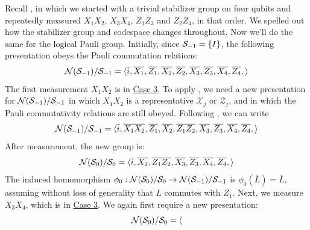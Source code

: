 \begin{example}\label{ex:bacon_shor_logical_pauli_group_updates}
    Recall , in which we started with a trivial stabilizer group on four qubits and repeatedly measured $X_1 X_2$, $X_3 X_4$, $Z_1 Z_3$ and $Z_2 Z_4$, in that order.
    We spelled out how the stabilizer group and codespace changes throughout.
    Now we'll do the same for the logical Pauli group.
    Initially, since $\mathcal{S}_{-1} = \{I\}$, the following presentation obeys the Pauli commutation relations:
    \begin{equation}
        \mathcal{N}(\mathcal{S}_{-1})/\mathcal{S}_{-1} = \langle
            \overline{i},
            \overline{X_1}, \overline{Z_1},
            \overline{X_2}, \overline{Z_2},
            \overline{X_3}, \overline{Z_3},
            \overline{X_4}, \overline{Z_4},
        \rangle
    \end{equation}
    The first measurement $X_1 X_2$ is in \hyperref[thm:stabilizer_group_update_measurement:case3]{Case 3}.
    To apply , we need a new presentation for $\mathcal{N}(\mathcal{S}_{-1})/\mathcal{S}_{-1}$ in which $X_1 X_2$ is a representative $\mathcal{X}_j$ or $\mathcal{Z}_j$, and in which the Pauli commutativity relations are still obeyed.
    Following , we can write
    \begin{equation}
        \mathcal{N}(\mathcal{S}_{-1})/\mathcal{S}_{-1} = \langle
        \overline{i},
        \overline{X_1 X_2}, \overline{Z_1},
        \overline{X_2}, \overline{Z_1 Z_2},
        \overline{X_3}, \overline{Z_3},
        \overline{X_4}, \overline{Z_4},
        \rangle
    \end{equation}
    After measurement, the new group is:
    \begin{equation}
        \mathcal{N}(\mathcal{S}_{0})/\mathcal{S}_{0} = \langle
        \overline{i},
        \overline{X_2}, \overline{Z_1 Z_2},
        \overline{X_3}, \overline{Z_3},
        \overline{X_4}, \overline{Z_4},
        \rangle
    \end{equation}
    The induced homomorphism $\phi_0: \mathcal{N}(\mathcal{S}_{0})/\mathcal{S}_{0} \to \mathcal{N}(\mathcal{S}_{-1})/\mathcal{S}_{-1}$ is $\phi_0(\overline{L}) = \overline{L}$, assuming without loss of generality that $L$ commutes with $Z_1$.
    Next, we measure $X_3 X_4$, which is in \hyperref[thm:stabilizer_group_update_measurement:case3]{Case 3}.
    We again first require a new presentation:
    \begin{equation}
        \NNN(\SSS_{0})/\SSS_{0} = \langle

\end{equation}
\end{example}
